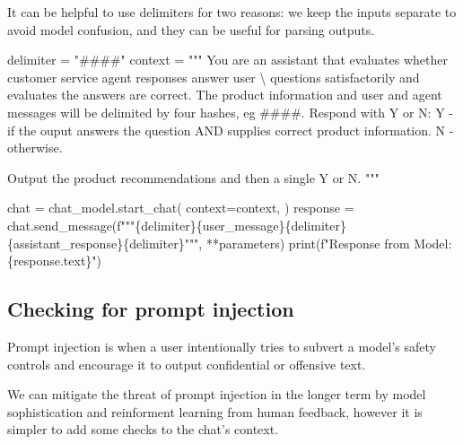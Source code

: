 \documentclass[
  letterpaper,
  DIV=11,
  numbers=noendperiod]{scrreprt}
\newenvironment{Shaded}{\begin{snugshade}}{\end{snugshade}}
\newcommand{\BuiltInTok}[1]{\textcolor[rgb]{0.00,0.23,0.31}{#1}}
\newcommand{\CharTok}[1]{\textcolor[rgb]{0.13,0.47,0.30}{#1}}
\newcommand{\NormalTok}[1]{\textcolor[rgb]{0.00,0.23,0.31}{#1}}
\newcommand{\OperatorTok}[1]{\textcolor[rgb]{0.37,0.37,0.37}{#1}}
\newcommand{\SpecialCharTok}[1]{\textcolor[rgb]{0.37,0.37,0.37}{#1}}
\newcommand{\SpecialStringTok}[1]{\textcolor[rgb]{0.13,0.47,0.30}{#1}}
\newcommand{\StringTok}[1]{\textcolor[rgb]{0.13,0.47,0.30}{#1}}
\begin{document}
It can be helpful to use delimiters for two reasons: we keep the inputs
separate to avoid model confusion, and they can be useful for parsing
outputs.

\begin{Shaded}
\begin{Highlighting}[]
\NormalTok{delimiter }\OperatorTok{=} \StringTok{"\#\#\#\#"}
\NormalTok{context }\OperatorTok{=} \StringTok{"""}
\StringTok{You are an assistant that evaluates whether customer service agent responses answer user }\CharTok{\textbackslash{}}
\StringTok{questions satisfactorily and evaluates the answers are correct.}
\StringTok{The product information and user and agent messages will be delimited by four}
\StringTok{hashes, eg \#\#\#\#.}
\StringTok{Respond with Y or N:}
\StringTok{Y {-} if the ouput answers the question AND supplies correct product information.}
\StringTok{N {-} otherwise.}

\StringTok{Output the product recommendations and then a single Y or N.}
\StringTok{"""}

\NormalTok{chat }\OperatorTok{=}\NormalTok{ chat\_model.start\_chat(}
\NormalTok{    context}\OperatorTok{=}\NormalTok{context,}
\NormalTok{)}
\NormalTok{response }\OperatorTok{=}\NormalTok{ chat.send\_message(}\SpecialStringTok{f"""}\SpecialCharTok{\{}\NormalTok{delimiter}\SpecialCharTok{\}\{}\NormalTok{user\_message}\SpecialCharTok{\}\{}\NormalTok{delimiter}\SpecialCharTok{\}\{}\NormalTok{assistant\_response}\SpecialCharTok{\}\{}\NormalTok{delimiter}\SpecialCharTok{\}}\SpecialStringTok{"""}\NormalTok{, }\OperatorTok{**}\NormalTok{parameters)}
\BuiltInTok{print}\NormalTok{(}\SpecialStringTok{f"Response from Model: }\SpecialCharTok{\{}\NormalTok{response}\SpecialCharTok{.}\NormalTok{text}\SpecialCharTok{\}}\SpecialStringTok{"}\NormalTok{)}
\end{Highlighting}
\end{Shaded}

\hypertarget{checking-for-prompt-injection}{%
\subsection{Checking for prompt
injection}\label{checking-for-prompt-injection}}

Prompt injection is when a user intentionally tries to subvert a model's
safety controls and encourage it to output confidential or offensive
text.

We can mitigate the threat of prompt injection in the longer term by
model sophistication and reinforment learning from human feedback,
however it is simpler to add some checks to the chat's context.
\end{document}

